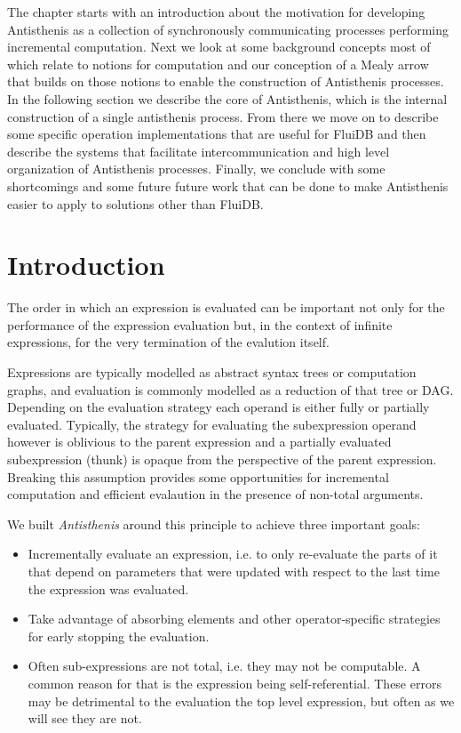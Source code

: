The chapter starts with an introduction about the motivation for
developing Antisthenis as a collection of synchronously communicating
processes performing incremental computation. Next we look at some
background concepts most of which relate to notions for computation
and our conception of a Mealy arrow that builds on those notions to
enable the construction of Antisthenis processes. In the following
section we describe the core of Antisthenis, which is the internal
construction of a single antisthenis process. From there we move on to
describe some specific operation implementations that are useful for
FluiDB and then describe the systems that facilitate
intercommunication and high level organization of Antisthenis
processes. Finally, we conclude with some shortcomings and some future
future work that can be done to make Antisthenis easier to apply to
solutions other than FluiDB.

\section{Introduction}
\label{sec:antisthenis_intro}

The order in which an expression is evaluated can be important not
only for the performance of the expression evaluation but, in the
context of infinite expressions, for the very termination of the
evalution itself.

Expressions are typically modelled as abstract syntax trees or
computation graphs, and evaluation is commonly modelled as a reduction
of that tree or DAG. Depending on the evaluation strategy each operand
is either fully or partially evaluated. Typically, the strategy for
evaluating the subexpression operand however is oblivious to the
parent expression and a partially evaluated subexpression (thunk) is
opaque from the perspective of the parent expression. Breaking this
assumption provides some opportunities for incremental computation and
efficient evalaution in the presence of non-total arguments.

We built \emph{Antisthenis} around this principle to achieve three
important goals:

\begin{itemize}
\item Incrementally evaluate an expression, i.e. to only re-evaluate
  the parts of it that depend on parameters that were updated with
  respect to the last time the expression was evaluated.
\item Take advantage of absorbing elements and other operator-specific
  strategies for early stopping the evaluation.
\item Often sub-expressions are not total, i.e. they may not be
  computable. A common reason for that is the expression being
  self-referential. These errors may be detrimental to the evaluation
  the top level expression, but often as we will see they are not.
\end{itemize}

